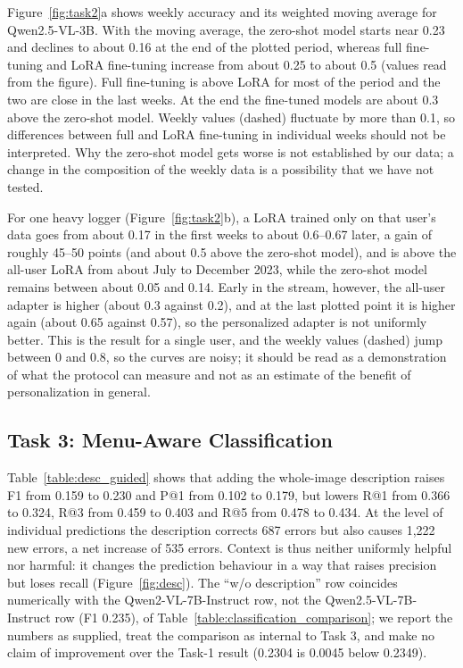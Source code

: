 \documentclass[sigconf, nonacm]{acmart}
\begin{document}
Figure~\ref{fig:task2}a shows weekly accuracy and its weighted moving average for Qwen2.5-VL-3B. With the moving average, the zero-shot model starts near 0.23 and declines to about 0.16 at the end of the plotted period, whereas full fine-tuning and LoRA fine-tuning increase from about 0.25 to about 0.5 (values read from the figure). Full fine-tuning is above LoRA for most of the period and the two are close in the last weeks. At the end the fine-tuned models are about 0.3 above the zero-shot model. Weekly values (dashed) fluctuate by more than 0.1, so differences between full and LoRA fine-tuning in individual weeks should not be interpreted. Why the zero-shot model gets worse is not established by our data; a change in the composition of the weekly data is a possibility that we have not tested.

For one heavy logger (Figure~\ref{fig:task2}b), a LoRA trained only on that user's data goes from about 0.17 in the first weeks to about 0.6--0.67 later, a gain of roughly 45--50 points (and about 0.5 above the zero-shot model), and is above the all-user LoRA from about July to December 2023, while the zero-shot model remains between about 0.05 and 0.14. Early in the stream, however, the all-user adapter is higher (about 0.3 against 0.2), and at the last plotted point it is higher again (about 0.65 against 0.57), so the personalized adapter is not uniformly better. This is the result for a single user, and the weekly values (dashed) jump between 0 and 0.8, so the curves are noisy; it should be read as a demonstration of what the protocol can measure and not as an estimate of the benefit of personalization in general.

\subsection{Task 3: Menu-Aware Classification}
Table~\ref{table:desc_guided} shows that adding the whole-image description raises F1 from 0.159 to 0.230 and P@1 from 0.102 to 0.179, but lowers R@1 from 0.366 to 0.324, R@3 from 0.459 to 0.403 and R@5 from 0.478 to 0.434. At the level of individual predictions the description corrects 687 errors but also causes 1,222 new errors, a net increase of 535 errors. Context is thus neither uniformly helpful nor harmful: it changes the prediction behaviour in a way that raises precision but loses recall (Figure~\ref{fig:desc}). The ``w/o description'' row coincides numerically with the Qwen2-VL-7B-Instruct row, not the Qwen2.5-VL-7B-Instruct row (F1 0.235), of Table~\ref{table:classification_comparison}; we report the numbers as supplied, treat the comparison as internal to Task 3, and make no claim of improvement over the Task-1 result (0.2304 is 0.0045 below 0.2349).
\end{document}
